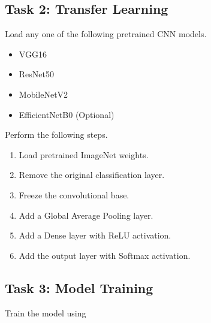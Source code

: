 \documentclass[11pt]{article}
\begin{document}
\subsection*{Task 2: Transfer Learning}

Load any one of the following pretrained CNN models.

\begin{itemize}

\item VGG16

\item ResNet50

\item MobileNetV2

\item EfficientNetB0 (Optional)

\end{itemize}

Perform the following steps.

\begin{enumerate}

\item Load pretrained ImageNet weights.

\item Remove the original classification layer.

\item Freeze the convolutional base.

\item Add a Global Average Pooling layer.

\item Add a Dense layer with ReLU activation.

\item Add the output layer with Softmax activation.

\end{enumerate}


\subsection*{Task 3: Model Training}

Train the model using
\end{document}
